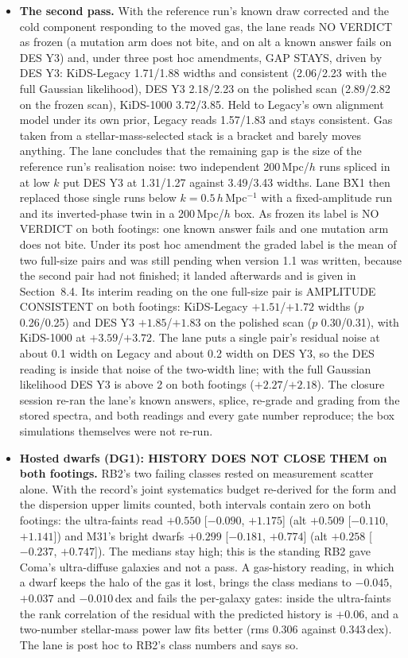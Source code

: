 \documentclass[10pt]{article}
\begin{document}
\begin{itemize}
\item \textbf{The second pass.} With the reference run's known draw corrected and the cold component responding to the moved gas, the lane reads NO VERDICT as frozen (a mutation arm does not bite, and on alt a known answer fails on DES Y3) and, under three post hoc amendments, GAP STAYS, driven by DES Y3: KiDS-Legacy 1.71/1.88 widths and consistent (2.06/2.23 with the full Gaussian likelihood), DES Y3 2.18/2.23 on the polished scan (2.89/2.82 on the frozen scan), KiDS-1000 3.72/3.85. Held to Legacy's own alignment model under its own prior, Legacy reads 1.57/1.83 and stays consistent. Gas taken from a stellar-mass-selected stack is a bracket and barely moves anything. The lane concludes that the remaining gap is the size of the reference run's realisation noise: two independent 200\,Mpc/$h$ runs spliced in at low $k$ put DES Y3 at 1.31/1.27 against 3.49/3.43 widths. Lane BX1 then replaced those single runs below $k=0.5\,h$\,Mpc$^{-1}$ with a fixed-amplitude run and its inverted-phase twin in a 200\,Mpc/$h$ box. As frozen its label is NO VERDICT on both footings: one known answer fails and one mutation arm does not bite. Under its post hoc amendment the graded label is the mean of two full-size pairs and was still pending when version 1.1 was written, because the second pair had not finished; it landed afterwards and is given in Section~8.4. Its interim reading on the one full-size pair is AMPLITUDE CONSISTENT on both footings: KiDS-Legacy $+1.51$/$+1.72$ widths ($p$ 0.26/0.25) and DES Y3 $+1.85$/$+1.83$ on the polished scan ($p$ 0.30/0.31), with KiDS-1000 at $+3.59$/$+3.72$. The lane puts a single pair's residual noise at about 0.1 width on Legacy and about 0.2 width on DES Y3, so the DES reading is inside that noise of the two-width line; with the full Gaussian likelihood DES Y3 is above 2 on both footings ($+2.27$/$+2.18$). The closure session re-ran the lane's known answers, splice, re-grade and grading from the stored spectra, and both readings and every gate number reproduce; the box simulations themselves were not re-run.
\item \textbf{Hosted dwarfs (DG1): HISTORY DOES NOT CLOSE THEM on both footings.} RB2's two failing classes rested on measurement scatter alone. With the record's joint systematics budget re-derived for the form and the dispersion upper limits counted, both intervals contain zero on both footings: the ultra-faints read $+0.550$ [$-0.090$, $+1.175$] (alt $+0.509$ [$-0.110$, $+1.141$]) and M31's bright dwarfs $+0.299$ [$-0.181$, $+0.774$] (alt $+0.258$ [$-0.237$, $+0.747$]). The medians stay high; this is the standing RB2 gave Coma's ultra-diffuse galaxies and not a pass. A gas-history reading, in which a dwarf keeps the halo of the gas it lost, brings the class medians to $-0.045$, $+0.037$ and $-0.010$\,dex and fails the per-galaxy gates: inside the ultra-faints the rank correlation of the residual with the predicted history is $+0.06$, and a two-number stellar-mass power law fits better (rms 0.306 against 0.343\,dex). The lane is post hoc to RB2's class numbers and says so.

\end{itemize}
\end{document}
